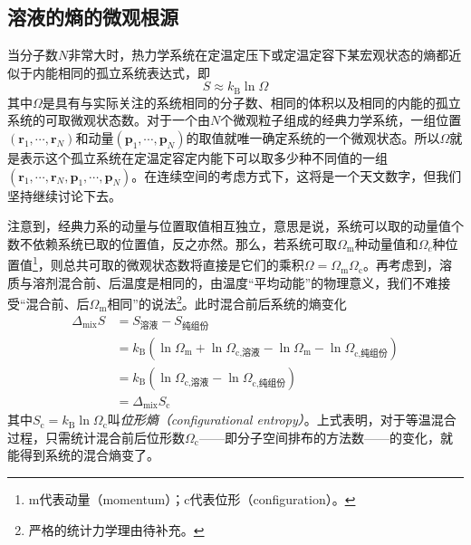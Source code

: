 \documentclass[main.tex]{subfiles}
\begin{document}
\subsection{溶液的熵的微观根源}
当分子数$N$非常大时，热力学系统在定温定压下或定温定容下某宏观状态的熵都近似于内能相同的孤立系统表达式，即
\[S\approx k_\text{B}\ln\Omega\]
其中$\Omega$是具有与实际关注的系统相同的分子数、相同的体积以及相同的内能的孤立系统的可取微观状态数。对于一个由$N$个微观粒子组成的经典力学系统，一组位置$\left(\mathbf{r}_1,\cdots,\mathbf{r}_N\right)$和动量$\left(\mathbf{p}_1,\cdots,\mathbf{p}_N\right)$的取值就唯一确定系统的一个微观状态。所以$\Omega$就是表示这个孤立系统在定温定容定内能下可以取多少种不同值的一组$\left(\mathbf{r}_1,\cdots,\mathbf{r}_N,\mathbf{p}_1,\cdots,\mathbf{p}_N\right)$。在连续空间的考虑方式下，这将是一个天文数字，但我们坚持继续讨论下去。

注意到，经典力系的动量与位置取值相互独立，意思是说，系统可以取的动量值个数不依赖系统已取的位置值，反之亦然。那么，若系统可取$\Omega_\text{m}$种动量值和$\Omega_c$种位置值\footnote{m代表动量（momentum）；c代表位形（configuration）。}，则总共可取的微观状态数将直接是它们的乘积$\Omega=\Omega_\text{m}\Omega_\text{c}$。再考虑到，溶质与溶剂混合前、后温度是相同的，由温度“平均动能”的物理意义，我们不难接受“混合前、后$\Omega_\text{m}$相同”的说法\footnote{严格的统计力学理由待补充。}。此时混合前后系统的熵变化
\[\begin{aligned}\Delta_\text{mix}S & =S_\text{溶液}-S_\text{纯组份}                                                                                  \\
                                  & =k_\text{B}\left(\ln\Omega_\text{m}+\ln\Omega_\text{c,溶液}-\ln\Omega_\text{m}-\ln\Omega_\text{c,纯组份}\right) \\
                                  & =k_\text{B}\left(\ln\Omega_\text{c,溶液}-\ln\Omega_\text{c,纯组份}\right)                                       \\
                                  & =\Delta_\text{mix}S_\text{c}\end{aligned}\]
其中$S_\text{c}=k_\text{B}\ln\Omega_\text{c}$叫\emph{位形熵（configurational entropy）}。上式表明，对于等温混合过程，只需统计混合前后位形数$\Omega_\text{c}$——即分子空间排布的方法数——的变化，就能得到系统的混合熵变了。
\end{document}
